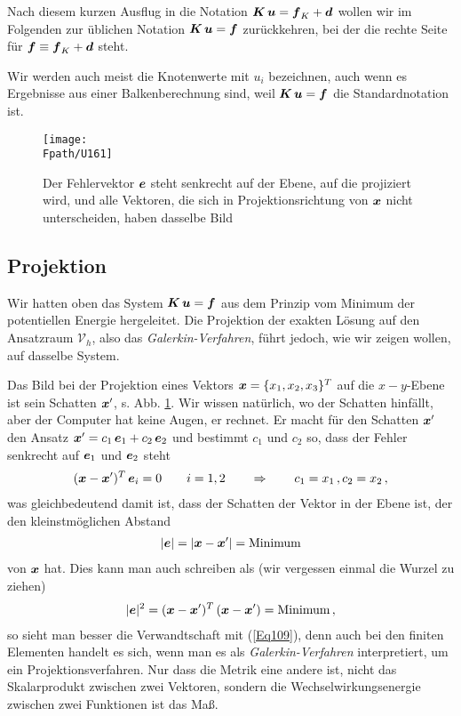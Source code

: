 Nach diesem kurzen Ausflug in die Notation $\mbox{\boldmath $K$}\,\mbox{\boldmath $u$} = \mbox{\boldmath $f$}_K + \mbox{\boldmath $d$}$  wollen wir im Folgenden zur \"{u}blichen Notation $\mbox{\boldmath $K$}\,\mbox{\boldmath $u$} = \mbox{\boldmath $f$}$ zur\"{u}ckkehren, bei der die rechte Seite f\"{u}r $\mbox{\boldmath $f$} \equiv \mbox{\boldmath $f$}_K + \mbox{\boldmath $d$}$ steht.

Wir werden auch meist die Knotenwerte mit $u_i$ bezeichnen, auch wenn es Ergebnisse aus einer Balkenberechnung sind, weil $\mbox{\boldmath $K$}\,\mbox{\boldmath $u$} = \mbox{\boldmath $f$}$ die Standardnotation ist.


\begin{figure}[tbp]
\centering
\if {} \sidecaption \fi
\texttt{[image: \\Fpath/U161]}
\caption{Der Fehlervektor $\mbox{\boldmath $e$}$ steht senkrecht auf der Ebene, auf die projiziert wird, und alle Vektoren, die sich in Projektionsrichtung von $\mbox{\boldmath $x$}$ nicht unterscheiden, haben dasselbe Bild} \label{U161}
\end{figure}%
{\textcolor{sectionTitleBlue}{\section{Projektion}}}
Wir hatten oben das System $\mbox{\boldmath $K$}\,\mbox{\boldmath $u$} = \mbox{\boldmath $f$}$ aus dem Prinzip vom Minimum der potentiellen Energie hergeleitet. Die Projektion der exakten L\"{o}sung auf den Ansatzraum $\mathcal{V}_h$, also das {\em Galerkin-Verfahren\/}, f\"{u}hrt jedoch, wie wir zeigen wollen, auf dasselbe System.

Das Bild bei der Projektion eines Vektors $\mbox{\boldmath $x$} =  \{x_1, x_2, x_3\}^T$ auf die $x\!-\!y$-Ebene ist sein Schatten $\mbox{\boldmath $x$}'$, s. Abb. \ref{U161}. Wir wissen nat\"{u}rlich, wo der Schatten hinf\"{a}llt, aber der Computer hat keine Augen, er rechnet. Er macht f\"{u}r den Schatten $\mbox{\boldmath $x$}'$ den Ansatz $\mbox{\boldmath $x$}' = c_1\,\mbox{\boldmath $e$}_1 + c_2\,\mbox{\boldmath $e$}_2$ und bestimmt $c_1$ und $c_2$ so, dass der Fehler senkrecht auf $\mbox{\boldmath $e$}_1$ und $\mbox{\boldmath $e$}_2$ steht
\begin{align}
(\mbox{\boldmath $x$} - \mbox{\boldmath $x$}')^T\, \mbox{\boldmath $e$}_i = 0 \qquad i = 1,2 \qquad \Rightarrow \qquad c_1 = x_1\,, c_2 = x_2\,,
\end{align}
was gleichbedeutend damit ist, dass der Schatten der Vektor in der Ebene ist, der den kleinstm\"{o}glichen Abstand
\begin{align}
|\mbox{\boldmath $e$}| = |\mbox{\boldmath $x$} - \mbox{\boldmath $x$}'| = \text{Minimum}
\end{align}
von $\mbox{\boldmath $x$}$ hat. Dies kann man auch schreiben als (wir vergessen einmal die Wurzel zu ziehen)
\begin{align}
|\mbox{\boldmath $e$}|^2 = (\mbox{\boldmath $x$} - \mbox{\boldmath $x$}')^T\,(\mbox{\boldmath $x$} - \mbox{\boldmath $x$}') = \text{Minimum}\,,
\end{align}
so sieht man besser die Verwandtschaft mit (\ref{Eq109}), denn auch bei den finiten Elementen handelt es sich, wenn man es als {\em Galerkin-Verfahren\/} interpretiert, um ein Projektionsverfahren. Nur dass die Metrik eine andere ist, nicht das Skalarprodukt zwischen zwei Vektoren, sondern die Wechselwirkungsenergie zwischen zwei Funktionen ist das Ma{\ss}.

